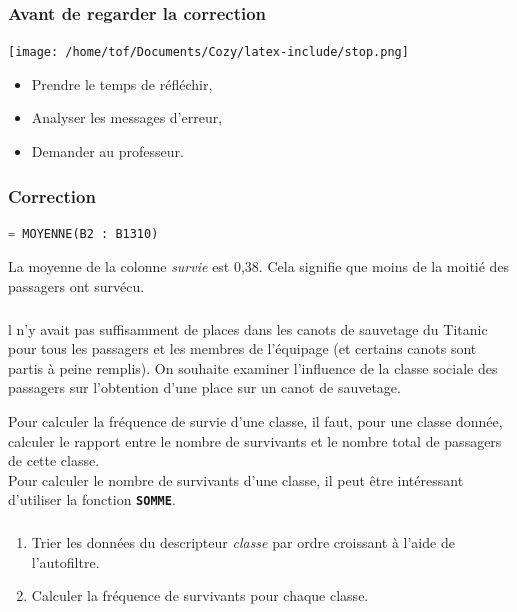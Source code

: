 \documentclass[svgnames,11pt]{beamer}
\begin{document}
\begin{frame}
    \frametitle{Avant de regarder la correction}
\begin{center}
    \centering
    \texttt{[image: /home/tof/Documents/Cozy/latex-include/stop.png]}
    \end{center}
{\Large
    \begin{itemize}
        \item Prendre le temps de réfléchir,
        \item Analyser les messages d'erreur,
        \item Demander au professeur.
    \end{itemize}
}
\end{frame}
\begin{frame}[fragile]
    \frametitle{Correction}

    \begin{center}
        \begin{lstlisting}[language=Python , basicstyle=\small, xleftmargin=2em, xrightmargin=2em]
= MOYENNE(B2 : B1310)
\end{lstlisting}
        \label{age}
        \end{center}
    La moyenne de la colonne \emph{survie} est 0,38. Cela signifie que moins de la moitié des passagers ont survécu.

\end{frame}
\begin{frame}
    \frametitle{}
    l n’y avait pas suffisamment de places dans les canots de sauvetage du Titanic pour tous les passagers et les membres de l’équipage (et certains canots sont partis à peine remplis). On souhaite examiner l’influence de la classe sociale des passagers sur l’obtention d’une place sur un canot de sauvetage.

    Pour calculer la fréquence de survie d'une classe, il faut, pour une classe donnée, calculer le rapport entre le nombre de survivants et le nombre total de passagers de cette classe.\\
    Pour calculer le nombre de survivants d'une classe, il peut être intéressant d'utiliser la fonction \textbf{\texttt{SOMME}}.
    

\end{frame}
\begin{frame}
    \frametitle{}

    \begin{activite}
        \begin{enumerate}
            \item Trier les données du descripteur \emph{classe} par ordre croissant à l’aide de l’autofiltre.
            \item Calculer la fréquence de survivants pour chaque classe.
        \end{enumerate}
        \end{activite}

\end{frame}
\end{document}
